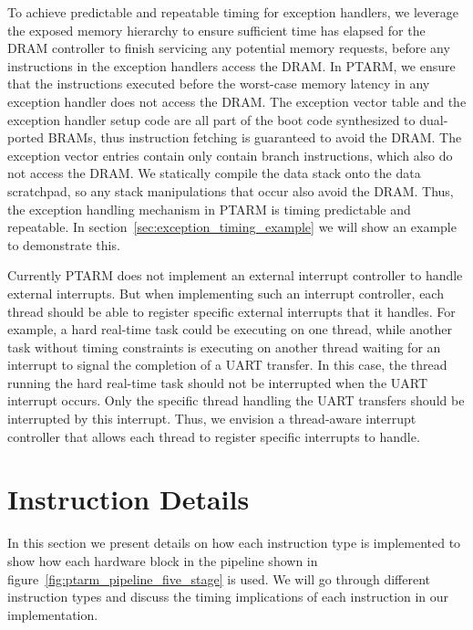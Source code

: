 To achieve predictable and repeatable timing for exception handlers, we leverage the exposed memory hierarchy to ensure sufficient time has elapsed for the DRAM controller to finish servicing any potential memory requests, before any instructions in the exception handlers access the DRAM.
In PTARM, we ensure that the instructions executed before the worst-case memory latency in any exception handler does not access the DRAM.  
The exception vector table and the exception handler setup code are all part of the boot code synthesized to dual-ported BRAMs, thus instruction fetching is guaranteed to avoid the DRAM.
The exception vector entries contain only contain branch instructions, which also do not access the DRAM.
We statically compile the data stack onto the data scratchpad, so any stack manipulations that occur also avoid the DRAM.
Thus, the exception handling mechanism in PTARM is timing predictable and repeatable. 
In section~\ref{sec:exception_timing_example} we will show an example to demonstrate this.  

Currently PTARM does not implement an external interrupt controller to handle external interrupts. 
But when implementing such an interrupt controller, each thread should be able to register specific external interrupts that it handles.
For example, a hard real-time task could be executing on one thread, while another task without timing constraints is executing on another thread waiting for an interrupt to signal the completion of a UART transfer.
In this case, the thread running the hard real-time task should not be interrupted when the UART interrupt occurs.
Only the specific thread handling the UART transfers should be interrupted by this interrupt.  
Thus, we envision a thread-aware interrupt controller that allows each thread to register specific interrupts to handle.

\section{Instruction Details}
\label{sec:ptarm_instructions}
In this section we present details on how each instruction type is implemented to show how each hardware block in the pipeline shown in figure~\ref{fig:ptarm_pipeline_five_stage} is used.
We will go through different instruction types and discuss the timing implications of each instruction in our implementation.
   
